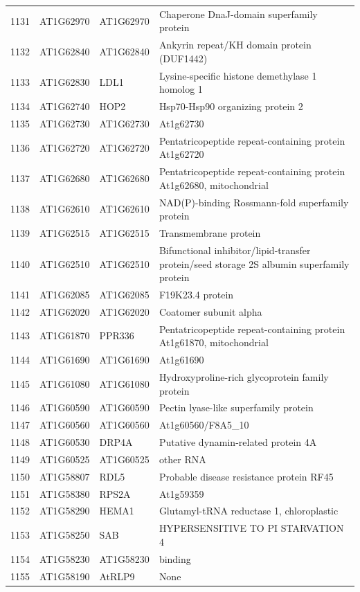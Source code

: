 \documentclass[11pt]{article}
\begin{document}
\begin{center}
\begin{tabular}{rlll}
1131 & AT1G62970 & AT1G62970 & Chaperone DnaJ-domain superfamily protein\\
1132 & AT1G62840 & AT1G62840 & Ankyrin repeat/KH domain protein (DUF1442)\\
1133 & AT1G62830 & LDL1 & Lysine-specific histone demethylase 1 homolog 1\\
1134 & AT1G62740 & HOP2 & Hsp70-Hsp90 organizing protein 2\\
1135 & AT1G62730 & AT1G62730 & At1g62730\\
1136 & AT1G62720 & AT1G62720 & Pentatricopeptide repeat-containing protein At1g62720\\
1137 & AT1G62680 & AT1G62680 & Pentatricopeptide repeat-containing protein At1g62680, mitochondrial\\
1138 & AT1G62610 & AT1G62610 & NAD(P)-binding Rossmann-fold superfamily protein\\
1139 & AT1G62515 & AT1G62515 & Transmembrane protein\\
1140 & AT1G62510 & AT1G62510 & Bifunctional inhibitor/lipid-transfer protein/seed storage 2S albumin superfamily protein\\
1141 & AT1G62085 & AT1G62085 & F19K23.4 protein\\
1142 & AT1G62020 & AT1G62020 & Coatomer subunit alpha\\
1143 & AT1G61870 & PPR336 & Pentatricopeptide repeat-containing protein At1g61870, mitochondrial\\
1144 & AT1G61690 & AT1G61690 & At1g61690\\
1145 & AT1G61080 & AT1G61080 & Hydroxyproline-rich glycoprotein family protein\\
1146 & AT1G60590 & AT1G60590 & Pectin lyase-like superfamily protein\\
1147 & AT1G60560 & AT1G60560 & At1g60560/F8A5\_10\\
1148 & AT1G60530 & DRP4A & Putative dynamin-related protein 4A\\
1149 & AT1G60525 & AT1G60525 & other RNA\\
1150 & AT1G58807 & RDL5 & Probable disease resistance protein RF45\\
1151 & AT1G58380 & RPS2A & At1g59359\\
1152 & AT1G58290 & HEMA1 & Glutamyl-tRNA reductase 1, chloroplastic\\
1153 & AT1G58250 & SAB & HYPERSENSITIVE TO PI STARVATION 4\\
1154 & AT1G58230 & AT1G58230 & binding\\
1155 & AT1G58190 & AtRLP9 & None\\

\end{tabular}
\end{center}
\end{document}
